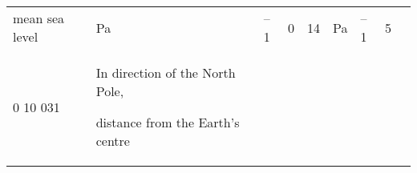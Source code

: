 \begin{longtable}[]{@{}lllllllll@{}}
\begin{minipage}[t]{0.08\columnwidth}
mean sea level\strut
\end{minipage} & \begin{minipage}[t]{0.08\columnwidth}\raggedright
Pa\strut
\end{minipage} & \begin{minipage}[t]{0.08\columnwidth}\raggedright
--1\strut
\end{minipage} & \begin{minipage}[t]{0.08\columnwidth}\raggedright
0\strut
\end{minipage} & \begin{minipage}[t]{0.08\columnwidth}\raggedright
14\strut
\end{minipage} & \begin{minipage}[t]{0.08\columnwidth}\raggedright
Pa\strut
\end{minipage} & \begin{minipage}[t]{0.08\columnwidth}\raggedright
--1\strut
\end{minipage} & \begin{minipage}[t]{0.08\columnwidth}\raggedright
5\strut
\end{minipage}\tabularnewline
\begin{minipage}[t]{0.08\columnwidth}\raggedright
0 10 031\strut
\end{minipage} & \begin{minipage}[t]{0.08\columnwidth}\raggedright
In direction of the North Pole,

distance from the Earth's centre


\end{minipage}
\end{longtable}
